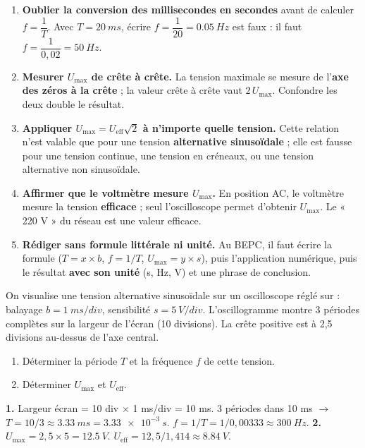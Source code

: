 \documentclass[11pt]{article}
\begin{document}
\begin{attention}
\begin{enumerate}
\item \textbf{Oublier la conversion des millisecondes en secondes} avant de calculer $f = \dfrac{1}{T}$. Avec $T = \SI{20}{ms}$, écrire $f = \dfrac{1}{20} = \SI{0,05}{Hz}$ est faux : il faut $f = \dfrac{1}{0,02} = \SI{50}{Hz}$.
\item \textbf{Mesurer $U_{\text{max}}$ de crête à crête.} La tension maximale se mesure de l'\textbf{axe des zéros à la crête} ; la valeur crête à crête vaut $2\,U_{\text{max}}$. Confondre les deux double le résultat.
\item \textbf{Appliquer $U_{\text{max}} = U_{\text{eff}}\sqrt{2}$ à n'importe quelle tension.} Cette relation n'est valable que pour une tension \textbf{alternative sinusoïdale} ; elle est fausse pour une tension continue, une tension en créneaux, ou une tension alternative non sinusoïdale.
\item \textbf{Affirmer que le voltmètre mesure $U_{\text{max}}$.} En position AC, le voltmètre mesure la tension \textbf{efficace} ; seul l'oscilloscope permet d'obtenir $U_{\text{max}}$. Le « 220 V » du réseau est une valeur efficace.
\item \textbf{Rédiger sans formule littérale ni unité.} Au BEPC, il faut écrire la formule ($T = x \times b$, $f = 1/T$, $U_{\text{max}} = y \times s$), puis l'application numérique, puis le résultat \textbf{avec son unité} (s, Hz, V) et une phrase de conclusion.
\end{enumerate}
\end{attention}

\begin{exercice}
On visualise une tension alternative sinusoïdale sur un oscilloscope réglé sur : balayage $b = \SI{1}{ms/div}$, sensibilité $s = \SI{5}{V/div}$.
L'oscillogramme montre 3 périodes complètes sur la largeur de l'écran (10 divisions). La crête positive est à 2,5 divisions au-dessus de l'axe central.
\begin{enumerate}
\item Déterminer la période $T$ et la fréquence $f$ de cette tension.
\item Déterminer $U_{\text{max}}$ et $U_{\text{eff}}$.
\end{enumerate}
\end{exercice}

\begin{corrige}[Exercice 1]
\textbf{1.} Largeur écran = 10 div $\times$ 1 ms/div = 10 ms. 3 périodes dans 10 ms $\rightarrow$ $T = 10 / 3 \approx \SI{3,33}{ms} = \SI{3,33e-3}{s}$.
$f = 1 / T = 1 / 0,00333 \approx \SI{300}{Hz}$.
\textbf{2.} $U_{\text{max}} = 2,5 \times 5 = \SI{12,5}{V}$.
$U_{\text{eff}} = 12,5 / 1,414 \approx \SI{8,84}{V}$.
\end{corrige}
\end{document}
